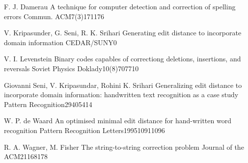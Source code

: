 
 {F. J. Damerau}
{A technique for computer detection and correction of spelling errors}
{Commun. ACM}{7(3)}{171}{176}

 {V. Kripasunder, G. Seni, R. K. Srihari}
{Generating edit distance to incorporate domain information}
{CEDAR/SUNY}{}{0}{}

 {V. I. Levenstein}
{Binary codes capables of correctiong deletions, insertions, and reversals}
{Soviet Physics Doklady}{10(8)}{707}{710}

 {Giovanni Seni, V. Kripasundar, Rohini K. Srihari}
{Generalizing edit distance to incorporate domain information: handwritten text recognition as a case study}
{Pattern Recognition}{29}{405}{414}

 {W. P. de Waard}
{An optimised minimal edit distance for hand-written word recognition}
{Pattern Recognition Letters}{1995}{1091}{1096}

 {R. A. Wagner, M. Fisher}
{The string-to-string correction problem}
{Journal of the ACM}{21}{168}{178}


